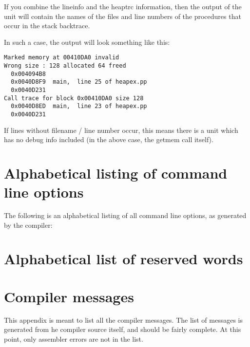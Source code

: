 If you combine the lineinfo and the heaptrc information, then the output
of the  unit will contain the names of the files and line
numbers of the procedures that occur in the stack backtrace.

In such a case, the output will look something like this:
\begin{verbatim}
Marked memory at 00410DA0 invalid
Wrong size : 128 allocated 64 freed
  0x004094B8
  0x0040D8F9  main,  line 25 of heapex.pp
  0x0040D231
Call trace for block 0x00410DA0 size 128
  0x0040D8ED  main,  line 23 of heapex.pp
  0x0040D231
\end{verbatim}
If lines without filename / line number occur, this means there is a unit which
has no debug info included (in the above case, the getmem call itself).


\appendix

\chapter{Alphabetical listing of command line options}
\label{ch:commandlineoptions}
The following is an alphabetical listing of all command line options, as
generated by the compiler:



\chapter{Alphabetical list of reserved words}
\label{ch:reserved}
\begin{multicols}{3}

\end{multicols}


\chapter{Compiler messages}
\label{ch:ErrorMessages}
This appendix is meant to list all the compiler messages. The list of
messages is generated from he compiler source itself, and should be fairly
complete. At this point, only assembler errors are not in the list.

